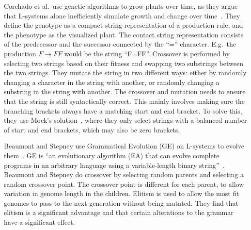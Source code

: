 Corchado et al.\ use genetic algorithms to grow plants over time, as they argue that L-systems alone inefficiently simulate growth and change over time~\cite{2009Corchado}.
They define the genotype as a compact string representation of a production rule, and the phenotype as the visualized plant.
The contact string representation consists of the predecessor and the successor connected by the ``='' character.
E.g.\ the production $F\rightarrow FF$ would be the string ``F=FF''.
Crossover is performed by selecting two strings based on their fitness and swapping two substrings between the two strings.
They mutate the string in two different ways: either by randomly changing a character in the string with another, or randomly changing a substring in the string with another.
The crossover and mutation needs to ensure that the string is still syntactically correct.
This mainly involves making sure the branching brackets always have a matching start and end bracket.
To solve this, they use Mock's solution~\cite{1998Mock}, where they only select strings with a balanced number of start and end brackets, which may also be zero brackets.

Beaumont and Stepney use Grammatical Evolution (GE) on L-systems to evolve them~\cite{2009Beaumont}.
GE is ``an evolutionary algorithm (EA) that can evolve complete programs in an arbitrary language using a variable-length binary string''~\cite{2003Oneil}.
Beaumont and Stepney do crossover by selecting random parents and selecting a random crossover point.
The crossover point is different for each parent, to allow variation in genome length in the children.
Elitism is used to allow the most fit genomes to pass to the next generation without being mutated.
They find that elitism is a significant advantage and that certain alterations to the grammar have a significant effect.
